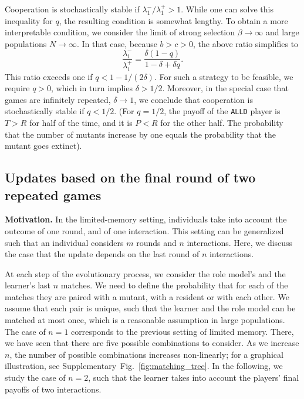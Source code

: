 \documentclass[11pt]{article}
\def\alld{\texttt{ALLD}}
\theoremstyle{plainCl1}
\theoremstyle{plainCl2}
\begin{document}
Cooperation is stochastically stable if $\lambda^-_1/\lambda^+_1\!>\!1$. 
While one can solve this inequality for $q$, the resulting condition is somewhat lengthy.  
To obtain a more interpretable condition, we consider the limit of strong selection \(\beta\! \rightarrow\! \infty\) and
large populations \(N \!\rightarrow \!\infty \). In that case, because $b\!>\!c\!>\!0$, the above ratio simplifies to
\begin{equation} \label{Eq:TransitionRatioSimple}
    \frac{\lambda^{-}_1}{\lambda^{+}_1} = \frac{\delta(1 - q)}{1 - \delta + \delta q}.
\end{equation}
This ratio exceeds one if  \(q <1 \!-\! 1/(2 \delta)\). 
For such a strategy to be feasible, we require $q\!>\!0$, which in turn implies $\delta\!>\!1/2$. 
Moreover, in the special case that games are infinitely repeated, \(\delta\! \rightarrow\! 1\), we conclude that cooperation is stochastically stable if  \(q \!<\! 1/2\). 
(For \(q\! =\! 1/2\), the payoff of the \alld{} player is
\(T \!>\! R\) for half of the time, and it is \(P\! < \! R\) for the other half. The
probability that the number of mutants increase by one equals the probability
that the mutant goes extinct). 



\subsection{Updates based on the final round of two repeated games} 
\label{section:m_one_n_two}


{\bf Motivation.} 
In the limited-memory setting, individuals take into account the outcome of one round, and of one interaction. 
This setting can be generalized such that an individual
considers \(m\) rounds and \(n\) interactions. Here, we discuss the case that
the update depends on the last round of \(n\) interactions.

At each step of the evolutionary process, we consider the role model's and the learner's last \(n\) matches. 
We need to define the probability that for each of
the matches they are paired with a mutant, with a resident or with each other.
We assume that each pair is unique, such that the learner and the role model
can be matched at most once, which is a reasonable assumption in large populations.
The case of \(n\!=\!1\) corresponds to the previous setting of limited memory. 
There, we have seen that there are five possible combinations to consider. 
As we increase $n$, the number of possible combinations increases non-linearly; 
for a graphical illustration, see Supplementary~Fig.~\ref{fig:matching_tree}. 
In the following, we study the case of \(n=2\), such that the learner takes into account the players' final payoffs of two interactions.\\
\end{document}
